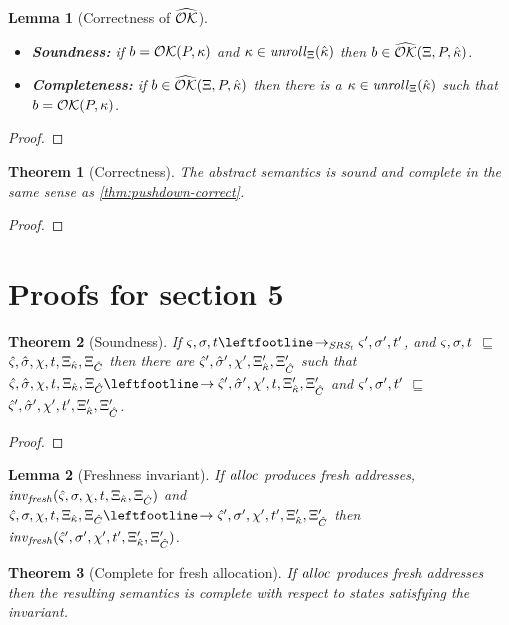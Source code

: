 \documentclass{article}
\newtheorem{theorem}{Theorem}
\newtheorem{lemma}{Lemma}
\begin{document}
\begin{lemma}[Correctness of $\widehat{{\mathcal O}{\mathcal K}}$]
  \begin{itemize}
  \item{\textbf{Soundness:} if $b = {\mathcal O}{\mathcal K}(P,\kappa)$ and $\kappa \in \mathit{unroll}_{\Xi}({\hat{\kappa}})$ then $b \in \widehat{{\mathcal O}{\mathcal K}}(\Xi,P,{\hat{\kappa}})$.}
  \item{\textbf{Completeness:} if $b \in \widehat{{\mathcal O}{\mathcal K}}(\Xi,P,{\hat{\kappa}})$ then there is a $\kappa \in \mathit{unroll}_{\Xi}({\hat{\kappa}})$ such that $b = {\mathcal O}{\mathcal K}(P,\kappa)$.}
  \end{itemize}
\end{lemma}
\begin{proof}
\end{proof}

\begin{theorem}[Correctness]
  The abstract semantics is sound and complete in the same sense as \autoref{thm:pushdown-correct}.
\end{theorem}
\begin{proof}
\end{proof}

\section{Proofs for section 5}

\begin{theorem}[Soundness]
  If $\mstate,\mstore,\mtime \stepto_{\SRSt} \mstate',\mstore',\mtime'$, and $\varsigma,\sigma,t$ $\sqsubseteq$ $\hat\varsigma,{\hat\sigma},\chi,t,\Xi_{{\hat{\kappa}}},\Xi_{{\hat{C}}}$ then there are $\hat\varsigma',{\hat\sigma}',\chi',\Xi_{{\hat{\kappa}}}',\Xi_{{\hat{C}}}'$ such that $\mastate,\mastore,\mmktab,\mtime,\mktab_{\makont},\mktab_{\mamkont} \stepto \mastate',\mastore',\mmktab',\mtime,\mktab_{\makont}',\mktab_{\mamkont}'$ and
$\varsigma',\sigma',t'$ $\sqsubseteq$ $\hat\varsigma',{\hat\sigma}',\chi',t',\Xi_{{\hat{\kappa}}}',\Xi_{{\hat{C}}}'$.
\end{theorem}
\begin{proof}
\end{proof}

\begin{lemma}[Freshness invariant]
  If $\mathit{alloc}$ produces fresh addresses, $\mathit{inv}_{\mathit{fresh}}(\hat\varsigma,\sigma,\chi,t,\Xi_{\hat{\kappa}},\Xi_{\hat{C}})$ and
$\mastate,\mstore,\mmktab,\mtime,\mktab_\makont,\mktab_\mamkont \stepto
\mastate',\mstore',\mmktab',\mtime',\mktab'_\makont,\mktab'_\mamkont$ then
$\mathit{inv}_{\mathit{fresh}}(\hat\varsigma',\sigma',\chi',t',\Xi'_{\hat{\kappa}},\Xi'_{\hat{C}})$.
\end{lemma}
\begin{theorem}[Complete for fresh allocation]
  If $\mathit{alloc}$ produces fresh addresses then the resulting semantics is complete with respect to states satisfying the invariant.
\end{theorem}
\end{document}
